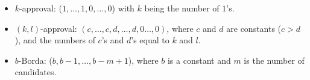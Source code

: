 
{
	\begin{itemize}
		\item $k$-approval: ($1,\ldots,1,0,\ldots,0$) with $k$ being the number
					of $1$'s.
		\item $(k,l)$-approval: $(c,\ldots, c, d,\ldots, d, 0\ldots, 0)$,
		      where $c$ and $d$ are constants ($c>d$),
					and the numbers of $c$'s and $d$'s equal to $k$ and $l$.
		\item $b$-Borda: ($b, b-1, \ldots, b-m+1$), where $b$ is a constant and
					$m$ is the number of candidates.
	\end{itemize}
}

